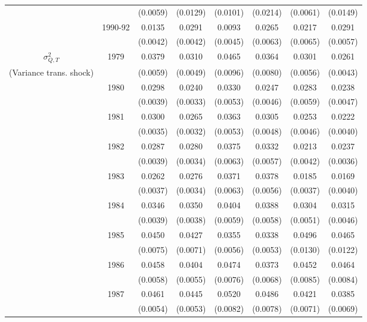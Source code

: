 \begin{table}
\begin{center}
{\begin{tabular}{cccc|cc|cc}
\\  &                    & (0.0059) & (0.0129)  & (0.0101) & (0.0214)  & (0.0061) & (0.0149) 
\\  & 1990-92 & 0.0135 &   0.0291 & 0.0093 &   0.0265 & 0.0217 &   0.0291 
\\  &         & (0.0042) & (0.0042) & (0.0045) & (0.0063) & (0.0065) & (0.0057) 
\\ \hline  
 $\sigma^2_{Q,T}$ & 1979      & 0.0379 &   0.0310 & 0.0465 &   0.0364 & 0.0301 &   0.0261 
\\ (Variance trans. shock) &     & (0.0059) & (0.0049) & (0.0096) & (0.0080) & (0.0056) & (0.0043) 
\\  & 1980 & 0.0298 &   0.0240 & 0.0330 &   0.0247 & 0.0283 &   0.0238
\\  &                    & (0.0039) & (0.0033)  & (0.0053) & (0.0046)  & (0.0059) & (0.0047) 
\\  & 1981 & 0.0300 &   0.0265 & 0.0363 &   0.0305 & 0.0253 &   0.0222
\\  &                    & (0.0035) & (0.0032)  & (0.0053) & (0.0048)  & (0.0046) & (0.0040) 
\\  & 1982 & 0.0287 &   0.0280 & 0.0375 &   0.0332 & 0.0213 &   0.0237
\\  &                    & (0.0039) & (0.0034)  & (0.0063) & (0.0057)  & (0.0042) & (0.0036) 
\\  & 1983 & 0.0262 &   0.0276 & 0.0371 &   0.0378 & 0.0185 &   0.0169
\\  &                    & (0.0037) & (0.0034)  & (0.0063) & (0.0056)  & (0.0037) & (0.0040) 
\\  & 1984 & 0.0346 &   0.0350 & 0.0404 &   0.0388 & 0.0304 &   0.0315
\\  &                    & (0.0039) & (0.0038)  & (0.0059) & (0.0058)  & (0.0051) & (0.0046) 
\\  & 1985 & 0.0450 &   0.0427 & 0.0355 &   0.0338 & 0.0496 &   0.0465
\\  &                    & (0.0075) & (0.0071)  & (0.0056) & (0.0053)  & (0.0130) & (0.0122) 
\\  & 1986 & 0.0458 &   0.0404 & 0.0474 &   0.0373 & 0.0452 &   0.0464
\\  &                    & (0.0058) & (0.0055)  & (0.0076) & (0.0068)  & (0.0085) & (0.0084) 
\\  & 1987 & 0.0461 &   0.0445 & 0.0520 &   0.0486 & 0.0421 &   0.0385
\\  &                    & (0.0054) & (0.0053)  & (0.0082) & (0.0078)  & (0.0071) & (0.0069) 

\end{tabular}}
\end{center}
\end{table}
